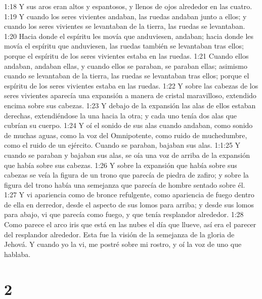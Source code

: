 1:18 Y sus aros eran altos y espantosos, y llenos de ojos alrededor en las cuatro.  
1:19 Y cuando los seres vivientes andaban, las ruedas andaban junto a ellos; y cuando los seres vivientes se levantaban de la tierra, las ruedas se levantaban.  
1:20 Hacia donde el espíritu les movía que anduviesen, andaban; hacia donde les movía el espíritu que anduviesen, las ruedas también se levantaban tras ellos; porque el espíritu de los seres vivientes estaba en las ruedas.  
1:21 Cuando ellos andaban, andaban ellas, y cuando ellos se paraban, se paraban ellas; asimismo cuando se levantaban de la tierra, las ruedas se levantaban tras ellos; porque el espíritu de los seres vivientes estaba en las ruedas. 
1:22 Y sobre las cabezas de los seres vivientes aparecía una expansión a manera de cristal   maravilloso, extendido encima sobre sus cabezas.  
1:23 Y debajo de la expansión las alas de ellos estaban derechas, extendiéndose la una hacia la otra; y cada uno tenía dos alas que cubrían su cuerpo.  
1:24 Y oí el sonido de sus alas cuando andaban, como sonido de muchas aguas, como la voz del Omnipotente, como ruido de muchedumbre, como el ruido de un ejército. Cuando se paraban, bajaban sus alas.  
1:1:25 Y cuando se paraban y bajaban sus alas, se oía una voz de arriba de la expansión que había sobre sus cabezas.  
1:26 Y sobre la expansión que había sobre sus cabezas se veía la figura de un trono que parecía de piedra de zafiro; y sobre la figura del trono había una semejanza que parecía de hombre sentado sobre él. 
1:27 Y vi apariencia como de bronce refulgente, como apariencia de fuego dentro de ella en derredor, desde el aspecto de sus lomos para arriba; y desde sus lomos para abajo, vi que parecía como fuego, y que tenía resplandor alrededor.  
1:28 Como parece el arco iris que está en las nubes el día que llueve, así era el parecer del resplandor alrededor. Esta fue la visión de la semejanza de la gloria de Jehová. Y cuando yo la vi, me postré sobre mi rostro, y oí la voz de uno que hablaba.  

\chapter{2}


